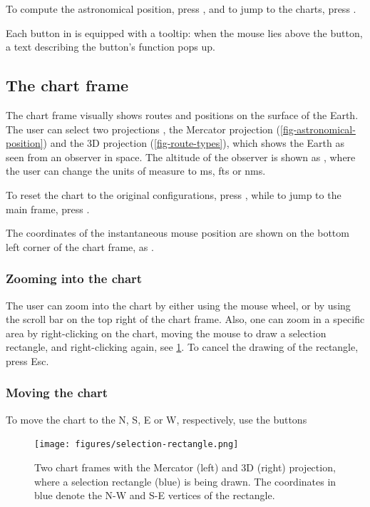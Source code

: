 \documentclass{ol-softwaremanual}
\begin{document}
To compute the astronomical position, press , and to jump to the charts, press . 

Each button in \thel is equipped with a tooltip: when the mouse lies above the button, a text describing the button's function pops up. 


\subsection{The chart frame}\label{section-chart-frame}

The chart frame visually shows  routes and positions on the surface of the Earth. 
The user can select two projections \cite{bowditch2002the}, the Mercator projection (\cref{fig-astronomical-position}) and the 3D projection (\cref{fig-route-types}), which shows the Earth as seen from an observer in space. The altitude of the observer is shown as , where the user can change the units of measure to \acp{m}, \acp{ft} or \acp{nm}. 

To reset the chart to the original configurations, press , while to jump to the main frame, press . 

The coordinates of the instantaneous mouse position are shown on the bottom left corner of the chart frame, as . 


\subsubsection{Zooming into the chart} The user can zoom into the chart by either using the mouse wheel, or by using the scroll bar on the top right of the chart frame. Also, one can zoom in a specific area by right-clicking on the chart, moving the mouse to draw a selection rectangle, and right-clicking again, see \cref{fig-selection-rectangle}. To cancel the drawing of the rectangle, press Esc. 

\subsubsection{Moving the chart}

To move the chart to the \ac{N}, \ac{S}, \ac{E} or \ac{W}, respectively, use the buttons

\begin{figure}
  \centering
  \texttt{[image: figures/selection-rectangle.png]}
  \caption{
    \label{fig-selection-rectangle}
    Two chart frames with the Mercator (left) and 3D (right) projection, where a selection rectangle (blue) is being drawn. The coordinates in blue denote the \acl{N}-\ac{W} and \acl{S}-\acl{E} vertices of the rectangle. 
  }
\end{figure}
\end{document}
